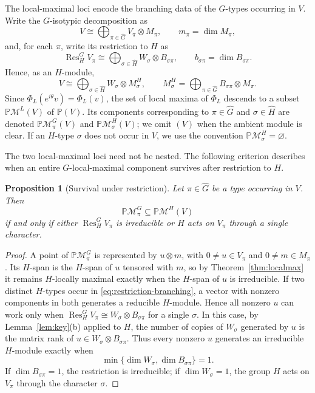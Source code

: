 \documentclass{amsart}
\newtheorem{proposition}[theorem]{Proposition}
\theoremstyle{remark}
\begin{document}
The local-maximal loci encode the branching data of the $G$-types occurring in $V$. Write the $G$-isotypic decomposition as
\begin{equation}\label{eq:G-isotypic-branching}
 V\cong\bigoplus_{\pi\in\widehat G}V_\pi\otimes M_\pi,
 \qquad m_\pi=\dim M_\pi,
\end{equation}
and, for each $\pi$, write its restriction to $H$ as
\begin{equation}\label{eq:restriction-branching}
 \operatorname{Res}_H^G V_\pi
 \cong\bigoplus_{\sigma\in\widehat H}W_\sigma\otimes B_{\sigma\pi},
 \qquad b_{\sigma\pi}=\dim B_{\sigma\pi}.
\end{equation}
Hence, as an $H$-module,
\[
 V\cong\bigoplus_{\sigma\in\widehat H}W_\sigma\otimes M_\sigma^H,
 \qquad
 M_\sigma^H=\bigoplus_{\pi\in\widehat G}B_{\sigma\pi}\otimes M_\pi.
\]
Since $\Phi_L(e^{i\theta}v)=\Phi_L(v)$, the set of local maxima of $\Phi_L$ descends to a subset $\mathbb P\mathcal M^L(V)$ of
$\mathbb P(V)$. Its components corresponding to $\pi\in\widehat G$ and $\sigma\in\widehat H$ are denoted
$\mathbb P\mathcal M_\pi^G(V)$ and $\mathbb P\mathcal M_\sigma^H(V)$; we omit $(V)$ when the
ambient module is clear. If an $H$-type $\sigma$ does not
occur in $V$, we use the convention $\mathbb P\mathcal M_\sigma^H=\varnothing$.
 
The two local-maximal loci need not be nested. The following criterion describes when an
entire $G$-local-maximal component survives after restriction to $H$.

\begin{proposition}[Survival under restriction]\label{prop:component-survival}
Let $\pi\in\widehat G$ be a type occurring in $V$. Then
\[
 \mathbb P\mathcal M_\pi^G\subseteq \mathbb P\mathcal M^H(V)
\]
if and only if either $\operatorname{Res}_H^G V_\pi$ is irreducible or $H$ acts on $V_\pi$ through a
single character.
\end{proposition}

\begin{proof}
A point of $\mathbb P\mathcal M_\pi^G$ is represented by $u\otimes m$, with $0\ne u\in V_\pi$
and $0\ne m\in M_\pi$. Its $H$-span is the $H$-span of $u$ tensored with $m$, so by
Theorem~\ref{thm:localmax} it remains $H$-locally maximal exactly when the $H$-span of $u$ is
irreducible. If two distinct $H$-types occur in \eqref{eq:restriction-branching}, a vector with nonzero
components in both generates a reducible $H$-module. Hence all nonzero $u$ can work only when
$\operatorname{Res}_H^G V_\pi\cong W_\sigma\otimes B_{\sigma\pi}$ for a single $\sigma$. In this case,
by Lemma~\ref{lem:key}(b) applied to $H$, the number of copies of $W_\sigma$ generated by $u$ is the
matrix rank of $u\in W_\sigma\otimes B_{\sigma\pi}$. Thus every nonzero $u$ generates an irreducible
$H$-module exactly when
\[
 \min\{\dim W_\sigma,\dim B_{\sigma\pi}\}=1.
\]
If $\dim B_{\sigma\pi}=1$, the restriction is irreducible; if $\dim W_\sigma=1$, the group $H$
acts on $V_\pi$ through the character $\sigma$.
\end{proof}
\end{document}

